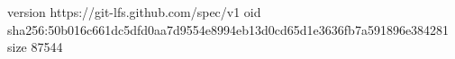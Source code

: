 version https://git-lfs.github.com/spec/v1
oid sha256:50b016c661dc5dfd0aa7d9554e8994eb13d0cd65d1e3636fb7a591896e384281
size 87544
